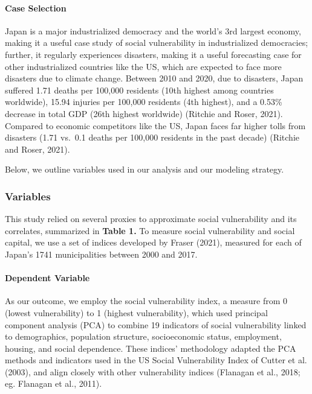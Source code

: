 \documentclass[]{elsarticle} %
\begin{document}
\hypertarget{case-selection}{%
\paragraph{Case Selection}\label{case-selection}}

Japan is a major industrialized democracy and the world's 3rd largest
economy, making it a useful case study of social vulnerability in
industrialized democracies; further, it regularly experiences disasters,
making it a useful forecasting case for other industrialized countries
like the US, which are expected to face more disasters due to climate
change. Between 2010 and 2020, due to disasters, Japan suffered 1.71
deaths per 100,000 residents (10th highest among countries worldwide),
15.94 injuries per 100,000 residents (4th highest), and a 0.53\%
decrease in total GDP (26th highest worldwide) (Ritchie and Roser,
2021). Compared to economic competitors like the US, Japan faces far
higher tolls from disasters (1.71 vs.~0.1 deaths per 100,000 residents
in the past decade) (Ritchie and Roser, 2021).

Below, we outline variables used in our analysis and our modeling
strategy.

\hypertarget{variables}{%
\subsubsection{Variables}\label{variables}}

This study relied on several proxies to approximate social vulnerability
and its correlates, summarized in \textbf{Table 1.} To measure social
vulnerability and social capital, we use a set of indices developed by
Fraser (2021), measured for each of Japan's 1741 municipalities between
2000 and 2017.

\hypertarget{dependent-variable}{%
\paragraph{Dependent Variable}\label{dependent-variable}}

As our outcome, we employ the social vulnerability index, a measure from
0 (lowest vulnerability) to 1 (highest vulnerability), which used
principal component analysis (PCA) to combine 19 indicators of social
vulnerability linked to demographics, population structure,
socioeconomic status, employment, housing, and social dependence. These
indices' methodology adapted the PCA methods and indicators used in the
US Social Vulnerability Index of Cutter et al. (2003), and align closely
with other vulnerability indices (Flanagan et al., 2018; eg. Flanagan et
al., 2011).
\end{document}
